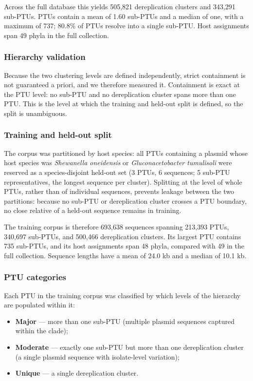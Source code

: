 Across the full database this yields 505,821 dereplication clusters and
343,291 sub-PTUs. PTUs contain a mean of 1.60 sub-PTUs and a median of one,
with a maximum of 737; 80.8\% of PTUs resolve into a single sub-PTU. Host
assignments span 49 phyla in the full collection.

\subsubsection*{Hierarchy validation}

Because the two clustering levels are defined independently, strict
containment is not guaranteed a priori, and we therefore measured it.
Containment is exact at the PTU level: no sub-PTU and no dereplication
cluster spans more than one PTU. This is the level at which the training and
held-out split is defined, so the split is unambiguous.

\subsubsection*{Training and held-out split}

The corpus was partitioned by host species: all PTUs containing a plasmid
whose host species was \emph{Shewanella oneidensis} or
\emph{Gluconacetobacter tumulisoli} were reserved as a species-disjoint
held-out set (3 PTUs, 6 sequences; 5 sub-PTU representatives, the longest
sequence per cluster). Splitting at the level of whole PTUs, rather than of
individual sequences, prevents leakage between the two partitions: because no
sub-PTU or dereplication cluster crosses a PTU boundary, no close relative of
a held-out sequence remains in training.

The training corpus is therefore 693,638 sequences spanning 213,393 PTUs,
340,697 sub-PTUs, and 500,466 dereplication clusters. Its largest PTU
contains 735 sub-PTUs, and its host assignments span 48 phyla, compared with
49 in the full collection. Sequence lengths have a mean of 24.0 kb and a
median of 10.1 kb.

\subsubsection*{PTU categories}

Each PTU in the training corpus was classified by which levels of the
hierarchy are populated within it:

\begin{itemize}
\item \textbf{Major} --- more than one sub-PTU (multiple plasmid sequences captured within the clade);
\item \textbf{Moderate} --- exactly one sub-PTU but more than one dereplication cluster (a single plasmid sequence with isolate-level variation);
\item \textbf{Unique} --- a single dereplication cluster.
\end{itemize}

